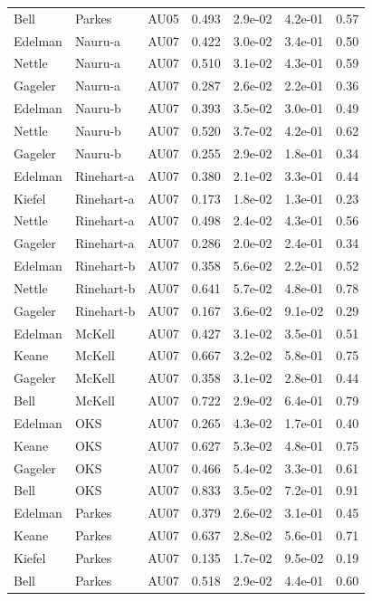 \documentclass{monashthesis}
\begin{document}
\begin{center}
\begin{longtable}{lllllll}
Bell & Parkes & AU05 & 0.493 & 2.9e-02 & 4.2e-01 & 0.57 \\
Edelman & Nauru-a & AU07 & 0.422 & 3.0e-02 & 3.4e-01 & 0.50 \\
Nettle & Nauru-a & AU07 & 0.510 & 3.1e-02 & 4.3e-01 & 0.59 \\
Gageler & Nauru-a & AU07 & 0.287 & 2.6e-02 & 2.2e-01 & 0.36 \\
Edelman & Nauru-b & AU07 & 0.393 & 3.5e-02 & 3.0e-01 & 0.49 \\
Nettle & Nauru-b & AU07 & 0.520 & 3.7e-02 & 4.2e-01 & 0.62 \\
Gageler & Nauru-b & AU07 & 0.255 & 2.9e-02 & 1.8e-01 & 0.34 \\
Edelman & Rinehart-a & AU07 & 0.380 & 2.1e-02 & 3.3e-01 & 0.44 \\
Kiefel & Rinehart-a & AU07 & 0.173 & 1.8e-02 & 1.3e-01 & 0.23 \\
Nettle & Rinehart-a & AU07 & 0.498 & 2.4e-02 & 4.3e-01 & 0.56 \\
Gageler & Rinehart-a & AU07 & 0.286 & 2.0e-02 & 2.4e-01 & 0.34 \\
Edelman & Rinehart-b & AU07 & 0.358 & 5.6e-02 & 2.2e-01 & 0.52 \\
Nettle & Rinehart-b & AU07 & 0.641 & 5.7e-02 & 4.8e-01 & 0.78 \\
Gageler & Rinehart-b & AU07 & 0.167 & 3.6e-02 & 9.1e-02 & 0.29 \\
Edelman & McKell & AU07 & 0.427 & 3.1e-02 & 3.5e-01 & 0.51 \\
Keane & McKell & AU07 & 0.667 & 3.2e-02 & 5.8e-01 & 0.75 \\
Gageler & McKell & AU07 & 0.358 & 3.1e-02 & 2.8e-01 & 0.44 \\
Bell & McKell & AU07 & 0.722 & 2.9e-02 & 6.4e-01 & 0.79 \\
Edelman & OKS & AU07 & 0.265 & 4.3e-02 & 1.7e-01 & 0.40 \\
Keane & OKS & AU07 & 0.627 & 5.3e-02 & 4.8e-01 & 0.75 \\
Gageler & OKS & AU07 & 0.466 & 5.4e-02 & 3.3e-01 & 0.61 \\
Bell & OKS & AU07 & 0.833 & 3.5e-02 & 7.2e-01 & 0.91 \\
Edelman & Parkes & AU07 & 0.379 & 2.6e-02 & 3.1e-01 & 0.45 \\
Keane & Parkes & AU07 & 0.637 & 2.8e-02 & 5.6e-01 & 0.71 \\
Kiefel & Parkes & AU07 & 0.135 & 1.7e-02 & 9.5e-02 & 0.19 \\
Bell & Parkes & AU07 & 0.518 & 2.9e-02 & 4.4e-01 & 0.60 \\

\end{longtable}
\end{center}
\end{document}
